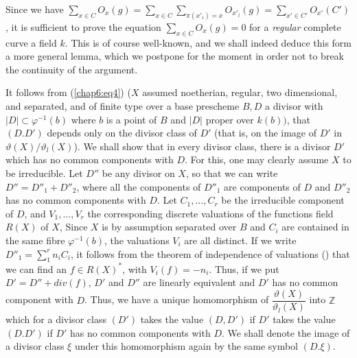Since we have $\sum\limits_{x\in C} O_x(g) = \sum\limits_{x\in C}
\sum\limits_{\pi (x'_i)=x} O_{x'_l}(g) =  \sum\limits_{x'\in
  C'} O_{x'}(C')$, it is sufficient to prove the equation
$\sum\limits_{x\in C}O_x(g)=0$ for a \textit{ regular } complete curve
a field $k$. This is of course well-known, and we shall indeed deduce
this form a more general lemma, which we postpone for the moment in
order not to break the continuity of the argument.  

It follows from (\ref{chap6:eq4}) ($X$ assumed noetherian, regular, two dimensional,
and separated, and of finite type over a base prescheme $B, D$ a
divisor with $|D|\subset \varphi^{-1}(b)$ where $b$ is a point of $B$
and $|D|$ proper over $k(b))$, that $(D.D')$ depends only on the
divisor class of $D'$ (that is, on the image of $D'$ in $\vartheta
(X)/\vartheta_l(X)$). We shall show that in every divisor class,
there is a divisor $D'$ which has no common components with $D$. For
this, one may clearly assume $X$ to be irreducible. Let $D''$ be any
divisor on $X$, so that we can write $D''=D''_1+D''_2$,\pageoriginale
where all the 
components of $D''_1$ are components of $D$ and $D''_2$ has no common
components with $D$. Let $C_1,\ldots,C_r$ be the irreducible component
of $D$, and $V_1,\ldots,V_r$ the corresponding discrete valuations of
the functions field $R(X)$ of $X$, Since $X$ is by assumption
separated over $B$ and $C_i$ are contained in the same fibre
$\varphi^{-1}(b)$, the valuations $V_i$ are all distinct. If we write
$D''_1 = \sum\limits^r_1 n_i C_i$, it follows from the theorem of
independence of  valuations (\cite{key14}) that we can find an $f\in
  R(X)^*$, with $V_i(f)=-n_i$. Thus, if we put $D'=D'' + div(f)$, $D'$ and
  $D''$ are linearly equivalent and $D'$ has no common component with
  $D$. Thus, we have a unique homomorphism of
  $\dfrac{\vartheta(X)}{\vartheta_l(X)}$ into $\mathbb{Z}$ which for a
  divisor class $(D')$ takes the value $(D,D')$  if $D'$ takes the
  value $(D.D')$ if $D'$ has no common components with $D$. We shall
  denote the image of a divisor class $\xi$ under this homomorphism
  again by the same symbol $(D.\xi)$.  

